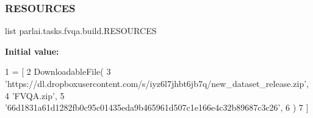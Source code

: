 \subsubsection{\texorpdfstring{R\+E\+S\+O\+U\+R\+C\+ES}{RESOURCES}}
{\footnotesize\ttfamily list parlai.\+tasks.\+fvqa.\+build.\+R\+E\+S\+O\+U\+R\+C\+ES}

{\bfseries Initial value\+:}
\begin{DoxyCode}
1 =  [
2     DownloadableFile(
3         \textcolor{stringliteral}{'https://dl.dropboxusercontent.com/s/iyz6l7jhbt6jb7q/new\_dataset\_release.zip'},
4         \textcolor{stringliteral}{'FVQA.zip'},
5         \textcolor{stringliteral}{'66d1831a61d1282fb0c95c01435eda9b465961d507c1e166e4c32b89687c3c26'},
6     )
7 ]
\end{DoxyCode}
